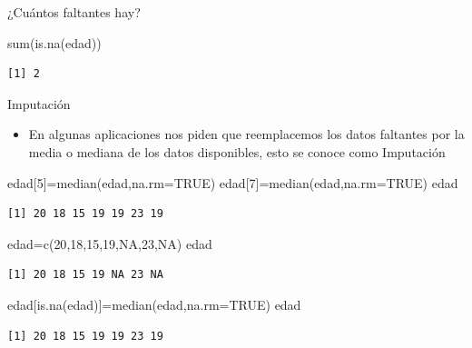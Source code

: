 \documentclass[
  ignorenonframetext,
  aspectratio=169,
  spanish,
]{beamer}
\newenvironment{Shaded}{\begin{snugshade}}{\end{snugshade}}
\newcommand{\AttributeTok}[1]{\textcolor[rgb]{0.40,0.45,0.13}{#1}}
\newcommand{\ConstantTok}[1]{\textcolor[rgb]{0.56,0.35,0.01}{#1}}
\newcommand{\DecValTok}[1]{\textcolor[rgb]{0.68,0.00,0.00}{#1}}
\newcommand{\FunctionTok}[1]{\textcolor[rgb]{0.28,0.35,0.67}{#1}}
\newcommand{\NormalTok}[1]{\textcolor[rgb]{0.00,0.23,0.31}{#1}}
\newcommand{\OtherTok}[1]{\textcolor[rgb]{0.00,0.23,0.31}{#1}}
\providecommand{\tightlist}{%
  \setlength{\itemsep}{0pt}\setlength{\parskip}{0pt}}
\begin{document}
\begin{frame}[fragile]{¿Cuántos faltantes hay?}
\label{cuuxe1ntos-faltantes-hay}
\begin{Shaded}
\begin{Highlighting}[]
\FunctionTok{sum}\NormalTok{(}\FunctionTok{is.na}\NormalTok{(edad)) }
\end{Highlighting}
\end{Shaded}

\begin{verbatim}
[1] 2
\end{verbatim}
\end{frame}

\begin{frame}[fragile]{Imputación}
\label{imputaciuxf3n}
\begin{itemize}
\tightlist
\item
  En algunas aplicaciones nos piden que reemplacemos los datos faltantes
  por la media o mediana de los datos disponibles, esto se conoce como
  {Imputación}
\end{itemize}

\begin{Shaded}
\begin{Highlighting}[]
\NormalTok{edad[}\DecValTok{5}\NormalTok{]}\OtherTok{=}\FunctionTok{median}\NormalTok{(edad,}\AttributeTok{na.rm=}\ConstantTok{TRUE}\NormalTok{)  }
\NormalTok{edad[}\DecValTok{7}\NormalTok{]}\OtherTok{=}\FunctionTok{median}\NormalTok{(edad,}\AttributeTok{na.rm=}\ConstantTok{TRUE}\NormalTok{)   }
\NormalTok{edad}
\end{Highlighting}
\end{Shaded}

\begin{verbatim}
[1] 20 18 15 19 19 23 19
\end{verbatim}

\begin{Shaded}
\begin{Highlighting}[]
\NormalTok{edad}\OtherTok{=}\FunctionTok{c}\NormalTok{(}\DecValTok{20}\NormalTok{,}\DecValTok{18}\NormalTok{,}\DecValTok{15}\NormalTok{,}\DecValTok{19}\NormalTok{,}\ConstantTok{NA}\NormalTok{,}\DecValTok{23}\NormalTok{,}\ConstantTok{NA}\NormalTok{) }
\NormalTok{edad}
\end{Highlighting}
\end{Shaded}

\begin{verbatim}
[1] 20 18 15 19 NA 23 NA
\end{verbatim}

\begin{Shaded}
\begin{Highlighting}[]
\NormalTok{edad[}\FunctionTok{is.na}\NormalTok{(edad)]}\OtherTok{=}\FunctionTok{median}\NormalTok{(edad,}\AttributeTok{na.rm=}\ConstantTok{TRUE}\NormalTok{)  }
\NormalTok{edad}
\end{Highlighting}
\end{Shaded}

\begin{verbatim}
[1] 20 18 15 19 19 23 19
\end{verbatim}
\end{frame}
\end{document}

